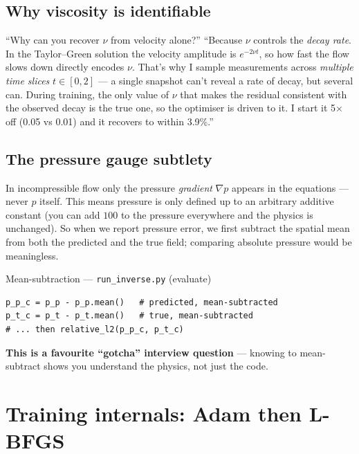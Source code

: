\documentclass[11pt,a4paper]{article}
\begin{document}
\subsection{Why viscosity is identifiable}
\label{sec:why-nu-identifiable}

\begin{defensebox}{``Why can you recover $\nu$ from velocity alone?''}
``Because $\nu$ controls the \emph{decay rate}. In the Taylor--Green solution the
velocity amplitude is $e^{-2\nu t}$, so how fast the flow slows down directly
encodes $\nu$. That's why I sample measurements across \emph{multiple time
slices} $t\in[0,2]$ --- a single snapshot can't reveal a rate of decay, but
several can. During training, the only value of $\nu$ that makes the residual
consistent with the observed decay is the true one, so the optimiser is driven
to it. I start it 5$\times$ off (0.05 vs 0.01) and it recovers to within 3.9\%.''
\end{defensebox}

\subsection{The pressure gauge subtlety}
\label{sec:pressure-gauge}

In incompressible flow only the pressure \emph{gradient} $\nabla p$ appears in
the equations --- never $p$ itself. This means pressure is only defined up to an
arbitrary additive constant (you can add $100$ to the pressure everywhere and
the physics is unchanged). So when we report pressure error, we first subtract
the spatial mean from both the predicted and the true field; comparing absolute
pressure would be meaningless.

\begin{coderef}{Mean-subtraction --- \texttt{run\_inverse.py} (evaluate)}
\begin{lstlisting}[style=pycode]
p_p_c = p_p - p_p.mean()   # predicted, mean-subtracted
p_t_c = p_t - p_t.mean()   # true, mean-subtracted
# ... then relative_l2(p_p_c, p_t_c)
\end{lstlisting}
\textbf{This is a favourite ``gotcha'' interview question} --- knowing to
mean-subtract shows you understand the physics, not just the code.
\end{coderef}

\section{Training internals: Adam then L-BFGS}
\label{sec:training-internals}
\end{document}
